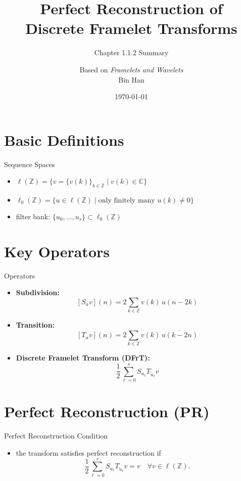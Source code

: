 \documentclass[11pt]{beamer}
\title[Framelet Transforms]{Perfect Reconstruction of\\ Discrete Framelet Transforms}
\subtitle{Chapter 1.1.2 Summary}
\author{Based on \emph{Framelets and Wavelets}\\ Bin Han}
\date{\today}
\begin{document}
\begin{frame}
  \maketitle
\end{frame}

\section{Basic Definitions}

\begin{frame}{Sequence Spaces}
  \begin{itemize}
    \item $\ell(\mathbb{Z})=\bigl\{v=\{v(k)\}_{k\in\mathbb{Z}}\mid v(k)\in\mathbb{C}\bigr\}$
    \item $\ell_0(\mathbb{Z})=\bigl\{u\in\ell(\mathbb{Z})\mid \text{only finitely many } u(k)\neq 0\bigr\}$
    \item filter bank: $\{u_0,\dots,u_s\}\subset \ell_0(\mathbb{Z})$
  \end{itemize}
\end{frame}

\section{Key Operators}

\begin{frame}{Operators}
  \begin{itemize}
    \item \textbf{Subdivision:}
          \[
            [S_u v](n)=2\sum_{k\in\mathbb{Z}} v(k)\,u(n-2k)
          \]
    \item \textbf{Transition:}
          \[
            [T_u v](n)=2\sum_{k\in\mathbb{Z}} v(k)\,\overline{u(k-2n)}
          \]
    \item \textbf{Discrete Framelet Transform (DFrT):}
          \[
            \frac12\sum_{\ell=0}^{s} S_{u_\ell}T_{\tilde u_\ell}v
          \]
  \end{itemize}
\end{frame}

\section{Perfect Reconstruction (PR)}

\begin{frame}{Perfect Reconstruction Condition}
  \begin{itemize}
    \item the transform satisfies perfect reconstruction if
          \[
            \frac{1}{2}\sum_{\ell=0}^s S_{u_\ell} T_{\tilde{u}_\ell} v = v \quad \forall v\in\ell(\mathbb{Z}).
          \]
  \end{itemize}
\end{frame}
\end{document}
